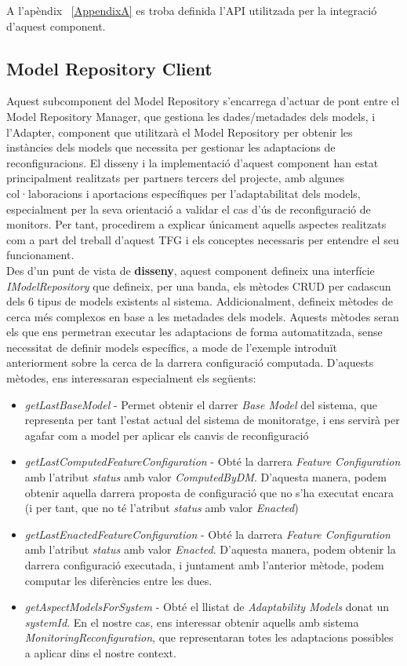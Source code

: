 A l'apèndix ~\ref{AppendixA} es troba definida l'API utilitzada per la integració d'aquest component.

\subsection{Model Repository Client}

Aquest subcomponent del Model Repository s'encarrega d'actuar de pont entre el Model Repository Manager, que gestiona les dades/metadades dels models, i l'Adapter, component que utilitzarà el Model Repository per obtenir les instàncies dels models que necessita per gestionar les adaptacions de reconfiguracions. El disseny i la implementació d'aquest component han estat principalment realitzats per partners tercers del projecte, amb algunes col·laboracions i aportacions específiques per l'adaptabilitat dels models, especialment per la seva orientació a validar el cas d'ús de reconfiguració de monitors. Per tant, procedirem a explicar únicament aquells aspectes realitzats com a part del treball d'aquest TFG i els conceptes necessaris per entendre el seu funcionament.\\

Des d'un punt de vista de \textbf{disseny}, aquest component defineix una interfície \textit{IModelRepository} que defineix, per una banda, els mètodes CRUD per cadascun dels 6 tipus de models existents al sistema. Addicionalment, defineix mètodes de cerca més complexos en base a les metadades dels models. Aquests mètodes seran els que ens permetran executar les adaptacions de forma automatitzada, sense necessitat de definir models específics, a mode de l'exemple introduït anteriorment sobre la cerca de la darrera configuració computada. D'aquests mètodes, ens interessaran especialment els següents:

\begin{itemize}
\item \textit{getLastBaseModel} - Permet obtenir el darrer \textit{Base Model} del sistema, que representa per tant l'estat actual del sistema de monitoratge, i ens servirà per agafar com a model per aplicar els canvis de reconfiguració
\item \textit{getLastComputedFeatureConfiguration} - Obté la darrera \textit{Feature Configuration} amb l'atribut \textit{status} amb valor \textit{ComputedByDM}. D'aquesta manera, podem obtenir aquella darrera proposta de configuració que no s'ha executat encara (i per tant, que no té l'atribut \textit{status} amb valor \textit{Enacted})
\item \textit{getLastEnactedFeatureConfiguration} - Obté la darrera \textit{Feature Configuration} amb l'atribut \textit{status} amb valor \textit{Enacted}. D'aquesta manera, podem obtenir la darrera configuració executada, i juntament amb l'anterior mètode, podem computar les diferències entre les dues.
\item \textit{getAspectModelsForSystem} - Obté el llistat de \textit{Adaptability Models} donat un \textit{systemId}. En el nostre cas, ens interessar obtenir aquells amb sistema \textit{MonitoringReconfiguration}, que representaran totes les adaptacions possibles a aplicar dins el nostre context.
\end{itemize}

